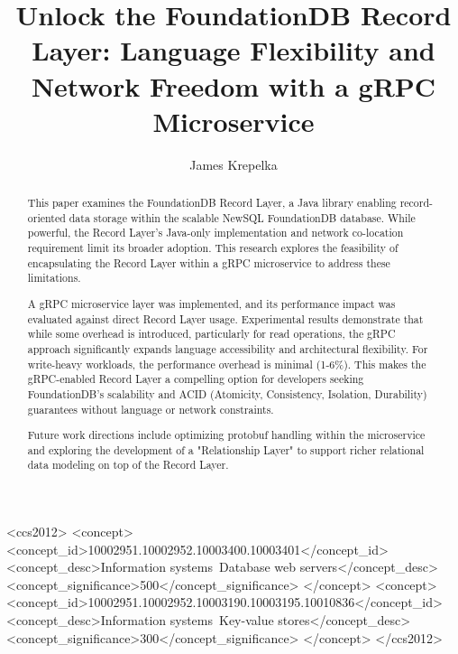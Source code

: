 \documentclass[sigconf]{acmart}
\begin{document}
\title[Unlock the FoundationDB Record Layer]{Unlock the FoundationDB Record Layer: Language Flexibility and Network Freedom with a gRPC Microservice}

\author{James Krepelka}

\begin{abstract}
    This paper examines the FoundationDB Record Layer, a Java library enabling record-oriented data storage within the scalable NewSQL FoundationDB database. While powerful, the Record Layer's Java-only implementation and network co-location requirement limit its broader adoption. This research explores the feasibility of encapsulating the Record Layer within a gRPC microservice to address these limitations.
    
    A gRPC microservice layer was implemented, and its performance impact was evaluated against direct Record Layer usage. Experimental results demonstrate that while some overhead is introduced, particularly for read operations, the gRPC approach significantly expands language accessibility and architectural flexibility. For write-heavy workloads, the performance overhead is minimal (1-6\%). This makes the gRPC-enabled Record Layer a compelling option for developers seeking FoundationDB's scalability and ACID (Atomicity, Consistency, Isolation, Durability) guarantees without language or network constraints.
    
    Future work directions include optimizing protobuf handling within the microservice and exploring the development of a "Relationship Layer" to support richer relational data modeling on top of the Record Layer.
\end{abstract}

\begin{CCSXML}
<ccs2012>
   <concept>
       <concept_id>10002951.10002952.10003400.10003401</concept_id>
       <concept_desc>Information systems~Database web servers</concept_desc>
       <concept_significance>500</concept_significance>
       </concept>
   <concept>
       <concept_id>10002951.10002952.10003190.10003195.10010836</concept_id>
       <concept_desc>Information systems~Key-value stores</concept_desc>
       <concept_significance>300</concept_significance>
       </concept>
 </ccs2012>
\end{CCSXML}
\end{document}
